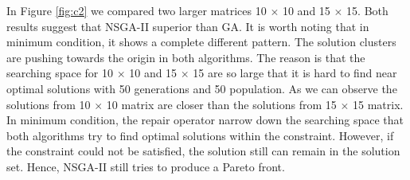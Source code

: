 \documentclass{llncs}
\begin{document}

In Figure \ref{fig:c2} we compared two larger matrices 10 $\times$ 10 and 15 $\times$ 15. Both results suggest that NSGA-II superior than GA.
It is worth noting that in minimum condition, it shows a complete different pattern. The solution clusters are pushing towards the origin in both
algorithms. The reason is that the searching space for 10 $\times$ 10 and 15 $\times$ 15 are so large that 
it is hard to find near optimal solutions with 50 generations and 50 population. As we can observe the solutions from 10 $\times$ 10 matrix are
closer than the solutions from 15 $\times$ 15 matrix. In minimum condition, the repair operator narrow down the searching space that both
algorithms try to find optimal solutions within the constraint. However, if the constraint could not be satisfied, the solution still can remain
in the solution set. Hence, NSGA-II still tries to produce a Pareto front.




\end{document}
